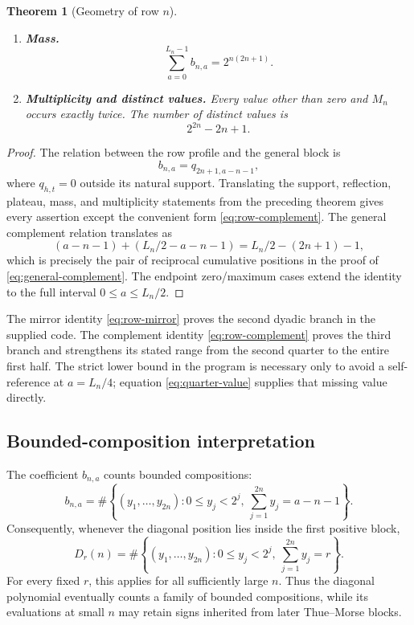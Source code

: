 \documentclass[11pt,oneside]{article}
\numberwithin{equation}{section}
\newtheorem{theorem}{Theorem}[section]
\theoremstyle{definition}
\theoremstyle{remark}
\newcommand{\Diag}{D}
\begin{document}
\begin{theorem}[Geometry of row \(n\)]
\begin{enumerate}
\item \textbf{Mass.}
\begin{equation}
 \boxed{
 \sum_{a=0}^{L_n-1}b_{n,a}=2^{n(2n+1)}.}
 \label{eq:row-mass}
\end{equation}

\item \textbf{Multiplicity and distinct values.}  Every value other than
zero and \(M_n\) occurs exactly twice.  The number of distinct values is
\begin{equation}
 \boxed{2^{2n}-2n+1.}
 \label{eq:row-distinct}
\end{equation}
\end{enumerate}
\end{theorem}

\begin{proof}
The relation between the row profile and the general block is
\begin{equation}
 b_{n,a}=q_{2n+1,a-n-1},
 \label{eq:b-q-shift}
\end{equation}
where \(q_{h,t}=0\) outside its natural support.  Translating the support,
reflection, plateau, mass, and multiplicity statements from the preceding
theorem gives every assertion except the convenient form
\eqref{eq:row-complement}.  The general complement relation translates as
\[
 (a-n-1)+(L_n/2-a-n-1)
 =L_n/2-(2n+1)-1,
\]
which is precisely the pair of reciprocal cumulative positions in the proof
of \eqref{eq:general-complement}.  The endpoint zero/maximum cases extend the
identity to the full interval \(0\le a\le L_n/2\).
\end{proof}

The mirror identity \eqref{eq:row-mirror} proves the second dyadic branch in
the supplied code.  The complement identity \eqref{eq:row-complement} proves
the third branch and strengthens its stated range from the second quarter to
the entire first half.  The strict lower bound in the program is necessary
only to avoid a self-reference at \(a=L_n/4\); equation
\eqref{eq:quarter-value} supplies that missing value directly.

\subsection{Bounded-composition interpretation}

The coefficient \(b_{n,a}\) counts bounded compositions:
\begin{equation}
 b_{n,a}
 =\#\left\{(y_1,\ldots,y_{2n}):
 0\le y_j<2^j,
 \ \sum_{j=1}^{2n}y_j=a-n-1\right\}.
 \label{eq:bounded-composition}
\end{equation}
Consequently, whenever the diagonal position lies inside the first positive
block,
\begin{equation}
 \Diag_r(n)=
 \#\left\{(y_1,\ldots,y_{2n}):
 0\le y_j<2^j,
 \ \sum_{j=1}^{2n}y_j=r\right\}.
 \label{eq:diagonal-composition}
\end{equation}
For every fixed \(r\), this applies for all sufficiently large \(n\).  Thus the
diagonal polynomial eventually counts a family of bounded compositions, while
its evaluations at small \(n\) may retain signs inherited from later
Thue--Morse blocks.
\end{document}
